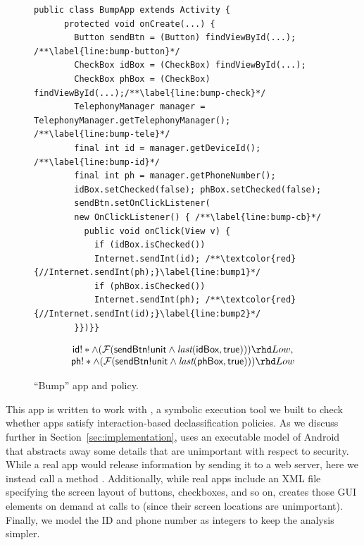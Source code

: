 \begin{figure}[t]
  \centering
  \begin{lstlisting}[name=Ex]
    public class BumpApp extends Activity {
      protected void onCreate(...) {
        Button sendBtn = (Button) findViewById(...); /**\label{line:bump-button}*/
        CheckBox idBox = (CheckBox) findViewById(...);
        CheckBox phBox = (CheckBox) findViewById(...);/**\label{line:bump-check}*/
        TelephonyManager manager = TelephonyManager.getTelephonyManager(); /**\label{line:bump-tele}*/
        final int id = manager.getDeviceId(); /**\label{line:bump-id}*/
        final int ph = manager.getPhoneNumber();
        idBox.setChecked(false); phBox.setChecked(false);
        sendBtn.setOnClickListener(
        new OnClickListener() { /**\label{line:bump-cb}*/
          public void onClick(View v) {
            if (idBox.isChecked())
            Internet.sendInt(id); /**\textcolor{red}{//Internet.sendInt(ph);}\label{line:bump1}*/
            if (phBox.isChecked())
            Internet.sendInt(ph); /**\textcolor{red}{//Internet.sendInt(id);}\label{line:bump2}*/
        }})}}
  \end{lstlisting}
  \begin{displaymath}
    \begin{array}{cc}
      \code{id}!\ast \wedge (\tfuture ( \code{sendBtn!unit} \land
      \tlast{\code{idBox}}{\code{true}})) \rhd Low, \\

      \code{ph}!\ast \wedge (\tfuture (
      \code{sendBtn!unit} \land
      \tlast{\code{phBox}}{\code{true}})) \rhd Low \\
    \end{array}
  \end{displaymath}
  \caption{``Bump'' app and policy.}
  \label{fig:app-bump}
\end{figure}

This app is written to work with \toolname{}, a symbolic execution tool we built to check
whether apps satisfy interaction-based declassification policies. As we
discuss further in Section~\ref{sec:implementation}, \toolname{} uses an
executable model of Android that abstracts away some details that are
unimportant with respect to security. While a real app would release
information by sending it to a web server, here we instead call a
method . Additionally, while real apps
include an XML file specifying the screen layout of buttons,
checkboxes, and so on, \toolname{} creates those GUI elements
on demand at calls to  (since their screen locations are
unimportant). Finally, we model the ID and phone number as
integers to keep the analysis simpler.

